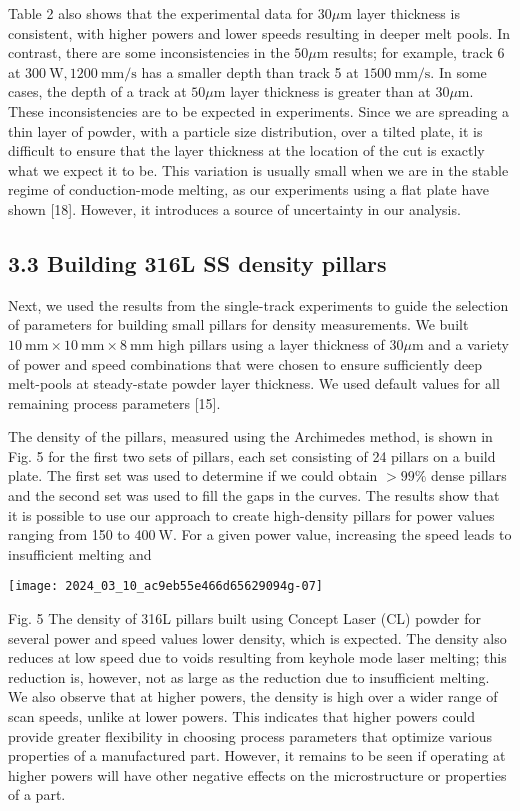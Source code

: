 \documentclass[10pt]{article}
\begin{document}
Table 2 also shows that the experimental data for $30 \mu \mathrm{m}$ layer thickness is consistent, with higher powers and lower speeds resulting in deeper melt pools. In contrast, there are some inconsistencies in the $50 \mu \mathrm{m}$ results; for example, track 6 at $300 \mathrm{~W}, 1200 \mathrm{~mm} / \mathrm{s}$ has a smaller depth than track 5 at $1500 \mathrm{~mm} / \mathrm{s}$. In some cases, the depth of a track at $50 \mu \mathrm{m}$ layer thickness is greater than at $30 \mu \mathrm{m}$. These inconsistencies are to be expected in experiments. Since we are spreading a thin layer of powder, with a particle size distribution, over a tilted plate, it is difficult to ensure that the layer thickness at the location of the cut is exactly what we expect it to be. This variation is usually small when we are in the stable regime of conduction-mode melting, as our experiments using a flat plate have shown [18]. However, it introduces a source of uncertainty in our analysis.

\subsection*{3.3 Building 316L SS density pillars}
Next, we used the results from the single-track experiments to guide the selection of parameters for building small pillars for density measurements. We built $10 \mathrm{~mm} \times 10 \mathrm{~mm} \times 8 \mathrm{~mm}$ high pillars using a layer thickness of $30 \mu \mathrm{m}$ and a variety of power and speed combinations that were chosen to ensure sufficiently deep melt-pools at steady-state powder layer thickness. We used default values for all remaining process parameters [15].

The density of the pillars, measured using the Archimedes method, is shown in Fig. 5 for the first two sets of pillars, each set consisting of 24 pillars on a build plate. The first set was used to determine if we could obtain $>99 \%$ dense pillars and the second set was used to fill the gaps in the curves. The results show that it is possible to use our approach to create high-density pillars for power values ranging from 150 to $400 \mathrm{~W}$. For a given power value, increasing the speed leads to insufficient melting and

\begin{center}
\texttt{[image: 2024\_03\_10\_ac9eb55e466d65629094g-07]}
\end{center}

Fig. 5 The density of 316L pillars built using Concept Laser (CL) powder for several power and speed values lower density, which is expected. The density also reduces at low speed due to voids resulting from keyhole mode laser melting; this reduction is, however, not as large as the reduction due to insufficient melting. We also observe that at higher powers, the density is high over a wider range of scan speeds, unlike at lower powers. This indicates that higher powers could provide greater flexibility in choosing process parameters that optimize various properties of a manufactured part. However, it remains to be seen if operating at higher powers will have other negative effects on the microstructure or properties of a part.
\end{document}
